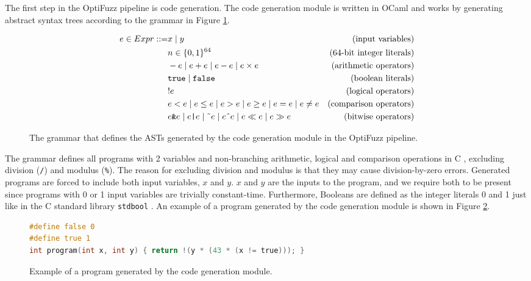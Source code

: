 The first step in the OptiFuzz pipeline is code generation. 
The code generation module is written in OCaml and works by generating abstract syntax trees according to the grammar in Figure \ref{fig:grammar}.

\begin{figure}[H]
  \centering
  \begin{align*}
    e \in Expr ::= & x \mid y &\text{(input variables)}\\
    & n \in \{0, 1\}^{64} &\text{(64-bit integer literals)}\\
    & -e \mid e + e \mid e - e \mid e \times e &\text{(arithmetic operators)}\\
    & \texttt{true} \mid \texttt{false} &\text{(boolean literals)}\\
    & !e &\text{(logical operators)}\\
    & e < e \mid e \leq e \mid e > e \mid e \geq e \mid e = e \mid e \neq e &\text{(comparison operators)}\\
    & e \texttt{\&} e \mid e \texttt{|} e \mid \text{\~{}} e \mid e \text{\^{}} e \mid e \ll e \mid e \gg e &\text{(bitwise operators)}
  \end{align*}
  \caption{The grammar that defines the ASTs generated by the code generation module in the OptiFuzz pipeline.}
  \label{fig:grammar}
\end{figure}

The grammar defines all programs with 2 variables and non-branching arithmetic, logical and comparison operations in C \cite{c-standard}, excluding division (\texttt{/}) and modulus (\texttt{\%}).
The reason for excluding division and modulus is that they may cause division-by-zero errors.
Generated programs are forced to include both input variables, $x$ and $y$.
$x$ and $y$ are the inputs to the program, and we require both to be present since programs with 0 or 1 input variables are trivially constant-time.
Furthermore, Booleans are defined as the integer literals 0 and 1 just like in the C standard library \texttt{stdbool} \cite{c-standard}.
An example of a program generated by the code generation module is shown in Figure \ref{fig:code-gen-example}.

\begin{figure}[H]
  \begin{lstlisting}[style=defstyle,language=C]
#define false 0
#define true 1
int program(int x, int y) { return !(y * (43 * (x != true))); } \end{lstlisting}
  \caption{Example of a program generated by the code generation module.}
  \label{fig:code-gen-example}
\end{figure}

